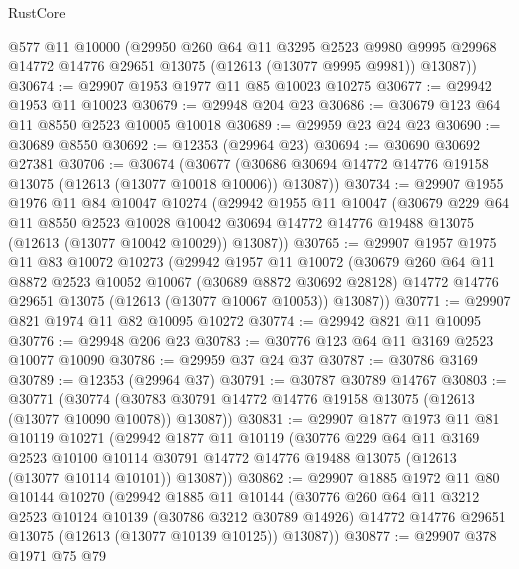 \begin{lexlean}{RustCore}
\begin{coremodule}
      @577
      @11
      @10000
      (@29950
        @260
        @64
        @11
        @3295
        @2523
        @9980
        @9995
        @29968
        @14772
        @14776
        @29651
        @13075
        (@12613 (@13077 @9995 @9981))
        @13087))
@30674 := @29907 @1953 @1977 @11 @85 @10023 @10275
@30677 := @29942 @1953 @11 @10023
@30679 := @29948 @204 @23
@30686 := @30679 @123 @64 @11 @8550 @2523 @10005 @10018
@30689 := @29959 @23 @24 @23
@30690 := @30689 @8550
@30692 := @12353 (@29964 @23)
@30694 := @30690 @30692 @27381
@30706 := @30674
    (@30677 (@30686 @30694 @14772 @14776 @19158 @13075 (@12613 (@13077 @10018 @10006)) @13087))
@30734 := @29907
    @1955
    @1976
    @11
    @84
    @10047
    @10274
    (@29942
      @1955
      @11
      @10047
      (@30679
        @229
        @64
        @11
        @8550
        @2523
        @10028
        @10042
        @30694
        @14772
        @14776
        @19488
        @13075
        (@12613 (@13077 @10042 @10029))
        @13087))
@30765 := @29907
    @1957
    @1975
    @11
    @83
    @10072
    @10273
    (@29942
      @1957
      @11
      @10072
      (@30679
        @260
        @64
        @11
        @8872
        @2523
        @10052
        @10067
        (@30689 @8872 @30692 @28128)
        @14772
        @14776
        @29651
        @13075
        (@12613 (@13077 @10067 @10053))
        @13087))
@30771 := @29907 @821 @1974 @11 @82 @10095 @10272
@30774 := @29942 @821 @11 @10095
@30776 := @29948 @206 @23
@30783 := @30776 @123 @64 @11 @3169 @2523 @10077 @10090
@30786 := @29959 @37 @24 @37
@30787 := @30786 @3169
@30789 := @12353 (@29964 @37)
@30791 := @30787 @30789 @14767
@30803 := @30771
    (@30774 (@30783 @30791 @14772 @14776 @19158 @13075 (@12613 (@13077 @10090 @10078)) @13087))
@30831 := @29907
    @1877
    @1973
    @11
    @81
    @10119
    @10271
    (@29942
      @1877
      @11
      @10119
      (@30776
        @229
        @64
        @11
        @3169
        @2523
        @10100
        @10114
        @30791
        @14772
        @14776
        @19488
        @13075
        (@12613 (@13077 @10114 @10101))
        @13087))
@30862 := @29907
    @1885
    @1972
    @11
    @80
    @10144
    @10270
    (@29942
      @1885
      @11
      @10144
      (@30776
        @260
        @64
        @11
        @3212
        @2523
        @10124
        @10139
        (@30786 @3212 @30789 @14926)
        @14772
        @14776
        @29651
        @13075
        (@12613 (@13077 @10139 @10125))
        @13087))
@30877 := @29907
    @378
    @1971
    @75
    @79

\end{coremodule}
\end{lexlean}
